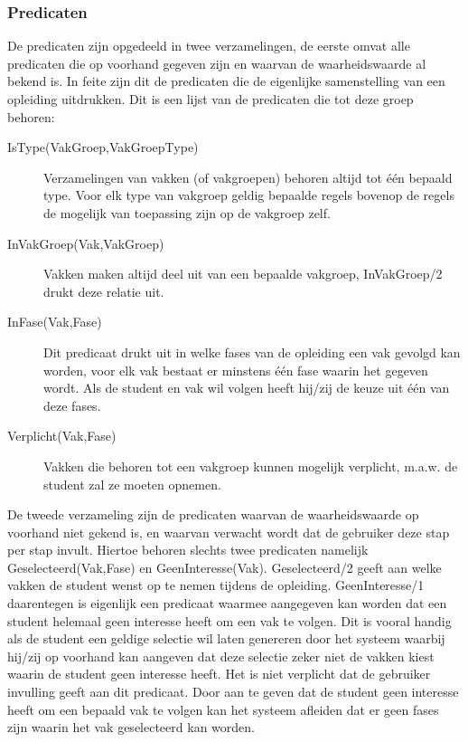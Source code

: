 \subsubsection{Predicaten}
De predicaten zijn opgedeeld in twee verzamelingen, de eerste omvat alle predicaten die op voorhand gegeven zijn en waarvan de waarheidswaarde al bekend is. In feite zijn dit de predicaten die de eigenlijke samenstelling van een opleiding uitdrukken. Dit is een lijst van de predicaten die tot deze groep behoren:
\begin{description}
\item [IsType(VakGroep,VakGroepType)] Verzamelingen van vakken (of vakgroepen) behoren altijd tot \'{e}\'{e}n bepaald type. Voor elk type van vakgroep geldig bepaalde regels bovenop de regels de mogelijk van toepassing zijn op de vakgroep zelf. 
\item [InVakGroep(Vak,VakGroep)] Vakken maken altijd deel uit van een bepaalde vakgroep, InVakGroep/2 drukt deze relatie uit. 
\item [InFase(Vak,Fase)] Dit predicaat drukt uit in welke fases van de opleiding een vak gevolgd kan worden, voor elk vak bestaat er minstens \'{e}\'{e}n fase waarin het gegeven wordt. Als de student en vak wil volgen heeft hij/zij de keuze uit \'{e}\'{e}n van deze fases.
\item [Verplicht(Vak,Fase)] Vakken die behoren tot een vakgroep kunnen mogelijk verplicht, m.a.w. de student zal ze moeten opnemen.
\end{description}

De tweede verzameling zijn de predicaten waarvan de waarheidswaarde op voorhand niet gekend is, en waarvan verwacht wordt dat de gebruiker deze stap per stap invult. Hiertoe behoren slechts twee predicaten namelijk Geselecteerd(Vak,Fase) en GeenInteresse(Vak). Geselecteerd/2 geeft aan welke vakken de student wenst op te nemen tijdens de opleiding. GeenInteresse/1 daarentegen is eigenlijk een predicaat waarmee aangegeven kan worden dat een student helemaal geen interesse heeft om een vak te volgen. Dit is vooral handig als de student een geldige selectie wil laten genereren door het systeem waarbij hij/zij op voorhand kan aangeven dat deze selectie zeker niet de vakken kiest waarin de student geen interesse heeft. Het is niet verplicht dat de gebruiker invulling geeft aan dit predicaat. Door aan te geven dat de student geen interesse heeft om een bepaald vak te volgen kan het systeem afleiden dat er geen fases zijn waarin het vak geselecteerd kan worden.

